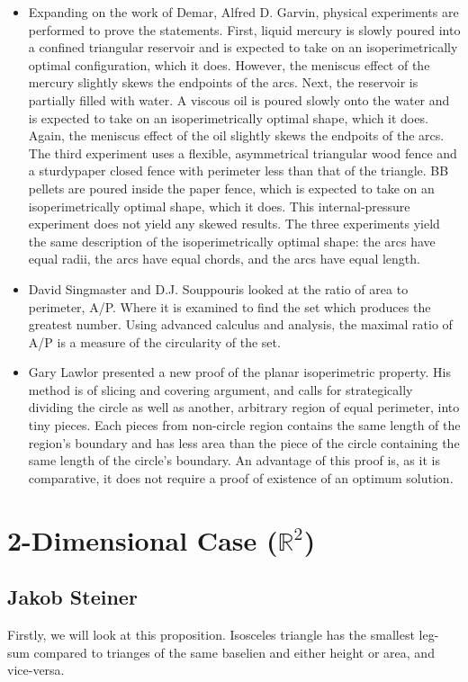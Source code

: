 \documentclass[a4paper]{book}
\numberwithin{theorem}{section}%
\begin{document}
\begin{itemize}
    \item Expanding on the work of Demar, Alfred D. Garvin, physical experiments are performed to prove the statements. First, liquid mercury is slowly poured into a confined triangular reservoir and is expected to take on an isoperimetrically optimal configuration, which it does. However, the meniscus effect of the mercury slightly skews the endpoints of the arcs. Next, the reservoir is partially filled with water. A viscous oil is poured slowly onto the water and is expected to take on an isoperimetrically optimal shape, which it does. Again, the meniscus effect of the oil slightly skews the endpoits of the arcs. The third experiment uses a flexible, asymmetrical triangular wood fence and a sturdypaper closed fence with perimeter less than that of the triangle. BB pellets are poured inside the paper fence, which is expected to take on an isoperimetrically optimal shape, which it does. This internal-pressure experiment does not yield any skewed results. The three experiments yield the same description of the isoperimetrically optimal shape: the arcs have equal radii, the arcs have equal chords, and the arcs have equal length.

    \item David Singmaster and D.J. Souppouris looked at the ratio of area to perimeter, A/P. Where it is examined to find the set which produces the greatest number. Using advanced calculus and analysis, the maximal ratio of A/P is a measure of the circularity of the set.

    \item Gary Lawlor presented a new proof of the planar isoperimetric property. His method is of slicing and covering argument, and calls for strategically dividing the circle as well as another, arbitrary region of equal perimeter, into tiny pieces. Each pieces from non-circle region contains the same length of the region’s boundary and has less area than the piece of the circle containing the same length of the circle’s boundary. An advantage of this proof is, as it is comparative, it does not require a proof of existence of an optimum solution.
\end{itemize}

\chapter{2-Dimensional Case ($\mathbb{R}^2$)}
\section{Jakob Steiner}
Firstly, we will look at this proposition. Isosceles triangle has the smallest leg-sum compared to trianges of the same baselien and either height or area, and vice-versa. 
\end{document}
